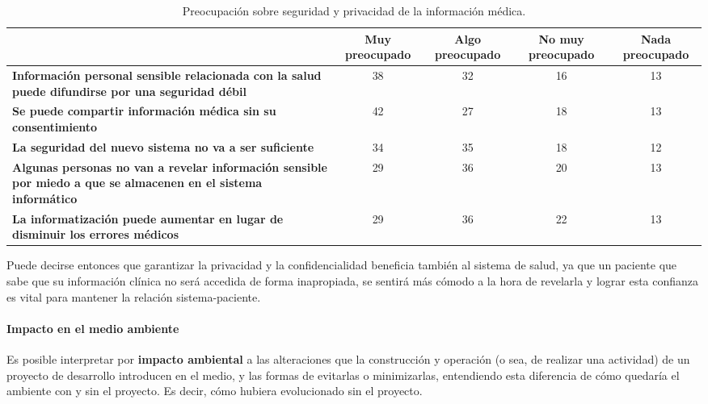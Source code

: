     \begin{table}[h]
        \centering
        \begin{tabulary}{\textwidth}{|L|C|C|C|C|}
            \hline
             & {\bf Muy preocupado} & {\bf Algo preocupado} &{\bf No muy preocupado} &{\bf Nada preocupado} \\ \hline
             \textbf{Información personal sensible relacionada con la salud puede difundirse por una seguridad débil}               & 38 & 32 & 16 & 13 \\ \hline
             \textbf{Se puede compartir información médica sin su consentimiento}                                                   & 42 & 27 & 18 & 13 \\ \hline
             \textbf{La seguridad del nuevo sistema no va a ser suficiente}                                                         & 34 & 35 & 18 & 12 \\ \hline
             \textbf{Algunas personas no van a revelar información sensible por miedo a que se almacenen en el sistema informático} & 29 & 36 & 20 & 13 \\ \hline
             \textbf{La informatización puede aumentar en lugar de disminuir los errores médicos}                                   & 29 & 36 & 22 & 13 \\ \hline
        \end{tabulary}
        \caption{Preocupación sobre seguridad y privacidad de la información médica.}
        \label{Preocupacion-seguridad}
    \end{table}
    
    Puede decirse entonces que garantizar la privacidad y la confidencialidad beneficia también al sistema de salud, ya que un paciente que sabe que su información clínica no será accedida de forma inapropiada, se sentirá más cómodo a la hora de revelarla y lograr esta confianza es vital para mantener la relación sistema-paciente.

	\paragraph{Impacto en el medio ambiente}

Es  posible interpretar por  \textbf{impacto  ambiental} a las alteraciones  que  la  construcción  y operación (o sea, de realizar una actividad) de un proyecto de desarrollo introducen en el medio, y las formas de evitarlas o minimizarlas, entendiendo esta diferencia de cómo quedaría el ambiente con y sin el proyecto.
Es decir, cómo hubiera evolucionado sin el proyecto.

